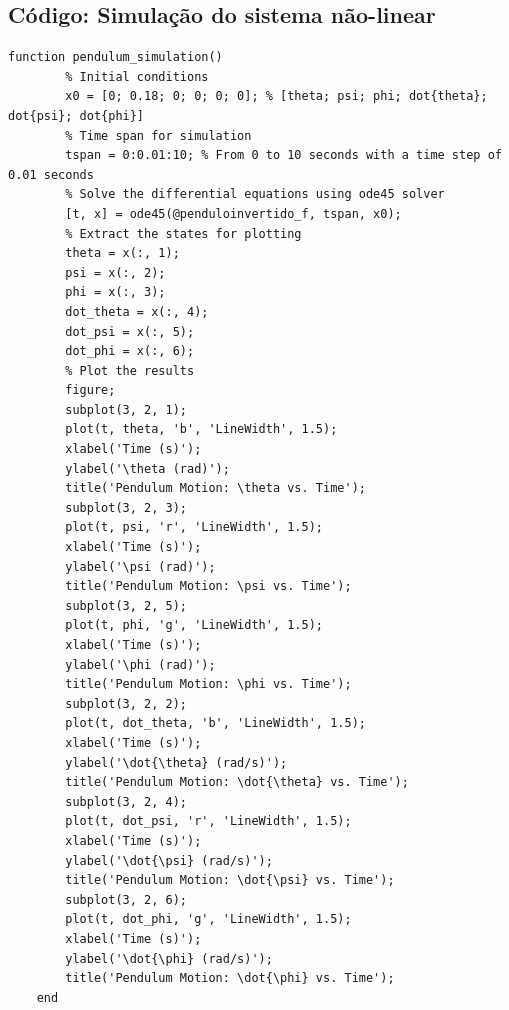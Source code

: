 \documentclass[10pt]{article}
\begin{document}
\begin{appendices}

\section{Código: Simulação do sistema não-linear}

\begin{lstlisting}[caption={Código da simulação do sistema não-linear com ode45}, label=lst:pendulum_sim]
    function pendulum_simulation()
        % Initial conditions
        x0 = [0; 0.18; 0; 0; 0; 0]; % [theta; psi; phi; dot{theta}; dot{psi}; dot{phi}]
        % Time span for simulation
        tspan = 0:0.01:10; % From 0 to 10 seconds with a time step of 0.01 seconds
        % Solve the differential equations using ode45 solver
        [t, x] = ode45(@penduloinvertido_f, tspan, x0);
        % Extract the states for plotting
        theta = x(:, 1);
        psi = x(:, 2);
        phi = x(:, 3);
        dot_theta = x(:, 4);
        dot_psi = x(:, 5);
        dot_phi = x(:, 6);
        % Plot the results
        figure;
        subplot(3, 2, 1);
        plot(t, theta, 'b', 'LineWidth', 1.5);
        xlabel('Time (s)');
        ylabel('\theta (rad)');
        title('Pendulum Motion: \theta vs. Time');
        subplot(3, 2, 3);
        plot(t, psi, 'r', 'LineWidth', 1.5);
        xlabel('Time (s)');
        ylabel('\psi (rad)');
        title('Pendulum Motion: \psi vs. Time');
        subplot(3, 2, 5);
        plot(t, phi, 'g', 'LineWidth', 1.5);
        xlabel('Time (s)');
        ylabel('\phi (rad)');
        title('Pendulum Motion: \phi vs. Time');
        subplot(3, 2, 2);
        plot(t, dot_theta, 'b', 'LineWidth', 1.5);
        xlabel('Time (s)');
        ylabel('\dot{\theta} (rad/s)');
        title('Pendulum Motion: \dot{\theta} vs. Time');
        subplot(3, 2, 4);
        plot(t, dot_psi, 'r', 'LineWidth', 1.5);
        xlabel('Time (s)');
        ylabel('\dot{\psi} (rad/s)');
        title('Pendulum Motion: \dot{\psi} vs. Time');
        subplot(3, 2, 6);
        plot(t, dot_phi, 'g', 'LineWidth', 1.5);
        xlabel('Time (s)');
        ylabel('\dot{\phi} (rad/s)');
        title('Pendulum Motion: \dot{\phi} vs. Time');
    end


\end{lstlisting}
\end{appendices}
\end{document}
